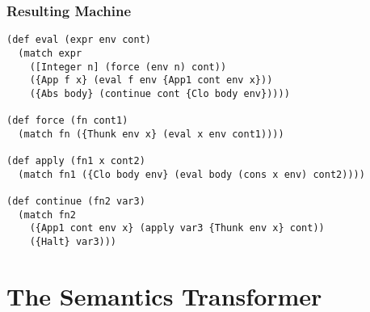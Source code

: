 \documentclass{beamer}
\begin{document}
\begin{frame}[fragile]
  \frametitle{Resulting Machine}
  \begin{lstlisting}
(def eval (expr env cont)
  (match expr
    ([Integer n] (force (env n) cont))
    ({App f x} (eval f env {App1 cont env x}))
    ({Abs body} (continue cont {Clo body env}))))

(def force (fn cont1)
  (match fn ({Thunk env x} (eval x env cont1))))

(def apply (fn1 x cont2)
  (match fn1 ({Clo body env} (eval body (cons x env) cont2))))

(def continue (fn2 var3)
  (match fn2
    ({App1 cont env x} (apply var3 {Thunk env x} cont))
    ({Halt} var3)))
  \end{lstlisting}
\end{frame}

\section{The Semantics Transformer}
\end{document}
